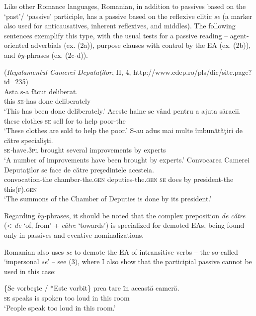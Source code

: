 \documentclass[output=paper]{langsci/langscibook}
\begin{document}
Like other Romance languages, Romanian, in addition to passives based on the ‘past’/ ‘passive’ participle, has a passive based on the reflexive clitic \textit{se} (a marker also used for anticausatives, inherent reflexives, and middles). The following sentences exemplify this type, with the usual tests for a passive reading – agent-oriented adverbials (ex. (2a)), purpose clauses with control by the EA (ex. (2b)), and \textit{by-}phrases (ex. (2c-d)).   

\ea%
    (\textit{Regulamentul Camerei Deputaţilor}, II, 4, http://www.cdep.ro/pls/dic/site.page?id=235)\label{ex:giurgea:2}\\
    \ea
    \gll Asta s-a      făcut deliberat.\\
         this  \textsc{se}{}-has done  deliberately\\
    \glt ‘This has been done deliberately.’
    \ex
    \gll Aceste haine   se vând pentru a ajuta săracii.\\
         these   clothes \textsc{se} sell   for      to help poor-the\\
    \glt  ‘These clothes are sold to help the poor.’
    \ex
    \gll S{}-au              adus     mai multe îmbunătăţiri    de către specialişti.\\
         \textsc{se}\textit{{}-}have.\textsc{3pl} brought several      improvements by         experts\\
    \glt ‘A number of improvements have been brought by experts.’
    \ex
    \gll Convocarea      Camerei                Deputaţilor           se  face de către preşedintele  acesteia.\\
         convocation-the chamber-the.\textsc{gen} deputies-the.\textsc{gen}  \textsc{se} does by    president-the this(\textsc{f).gen}\\
    \glt ‘The summons of the Chamber of Deputies is done by its president.’
    \z
\z

Regarding \textit{by-}phrases, it should be noted that the complex preposition \textit{de către} (< \textit{de} ‘of, from’ + \textit{către} ‘towards’) is specialized for demoted EAs, being found only in passives and eventive nominalizations.

Romanian also uses \textit{se} to demote the EA of intransitive verbs – the so-called ‘impersonal \textit{se}’ – see (3), where I also show that the participial passive cannot be used in this case:

\ea%
    \label{ex:giurgea:3}
    \gll \{Se vorbeşte / *Este vorbit\} prea tare în această cameră.\\
         \textsc{se} speaks       is      spoken too  loud in this       room\\
    \glt ‘People speak too loud in this room.’
    \z
\end{document}
